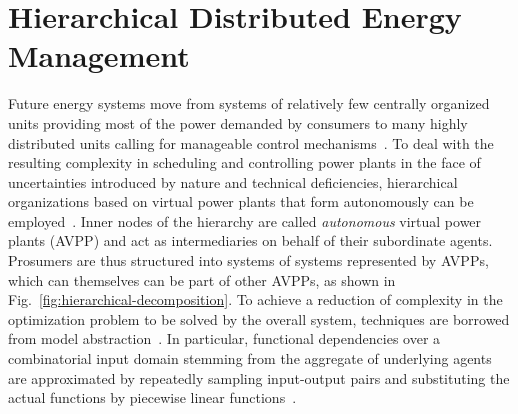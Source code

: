 \documentclass[conference]{IEEEtran}
\newcommand{\fref}[1]{Fig.~\ref{#1}}
\begin{document}
\section{Hierarchical Distributed Energy Management}
Future energy systems move from systems of relatively few centrally organized units
providing most of the power demanded by consumers to many highly distributed units calling
for manageable control mechanisms~\cite{Ramchurn2012}.
To deal with the resulting complexity in scheduling and controlling power plants in the face of 
uncertainties introduced by nature and technical deficiencies, hierarchical organizations based on virtual power plants
that form autonomously can be employed~\cite{Anders-TAAS-2015,niesse2014conjoint}.
Inner nodes of the hierarchy are called  \emph{autonomous} virtual power plants (AVPP) and act as intermediaries on behalf of their subordinate
agents. Prosumers are thus structured into systems of systems represented by AVPPs, which can themselves can be part of other AVPPs, as 
shown in \fref{fig:hierarchical-decomposition}. To achieve a reduction of complexity in the optimization 
problem to be solved by the overall system, techniques are borrowed from model abstraction~\cite{Frantz_Taxonomy}. 
In particular, functional dependencies over a combinatorial input domain stemming from the
aggregate of underlying agents are approximated by repeatedly sampling input-output pairs
and substituting the actual functions by piecewise linear functions~\cite{Schiendorfer2014}. 
\end{document}
